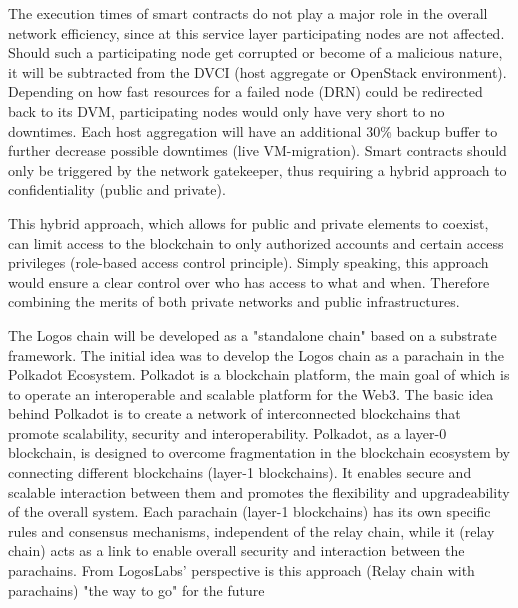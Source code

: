 \documentclass[]{article}
\begin{document}
The execution times of smart contracts do not play a major role in the overall network efficiency, since at this service layer participating nodes are not affected.
Should such a participating node get corrupted or become of a malicious nature, it will be subtracted from the DVCI (host aggregate or OpenStack environment).
Depending on how fast resources for a failed node (DRN) could be redirected back to its DVM, participating nodes would only have very short to no downtimes. 
Each host aggregation will have an additional 30\% backup buffer to further decrease possible downtimes (live VM-migration).
Smart contracts should only be triggered by the network gatekeeper, thus requiring a hybrid approach to confidentiality (public and private).

This hybrid approach, which allows for public and private elements to coexist, can limit access to the blockchain to only authorized accounts and certain access privileges (role-based access control principle).
Simply speaking, this approach would ensure a clear control over who has access to what and when.
Therefore combining the merits of both private networks and public infrastructures.

The Logos chain will be developed as a "standalone chain" based on a substrate framework.
The initial idea was to develop the Logos chain as a parachain in the Polkadot Ecosystem.
Polkadot is a blockchain platform, the main goal of which is to operate an interoperable and scalable platform for the Web3.
The basic idea behind Polkadot is to create a network of interconnected blockchains that promote scalability, security and interoperability.
Polkadot, as a layer-0 blockchain, is designed to overcome fragmentation in the blockchain ecosystem by connecting different blockchains (layer-1 blockchains). 
It enables secure and scalable interaction between them and promotes the flexibility and upgradeability of the overall system.
Each parachain \cite{PolkadotDoc-parachain} (layer-1 blockchains) has its own specific rules and consensus mechanisms, independent of the relay chain, while it (relay chain) acts as a link to enable overall security and interaction between the parachains.
From LogosLabs' perspective is this approach (Relay chain with parachains) "the way to go" for the future
\end{document}
